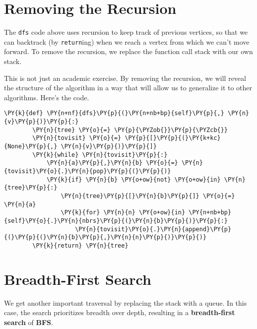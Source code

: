 \section{Removing the Recursion}


The \texttt{dfs} code above uses recursion to keep track of previous vertices, so that we can backtrack (by \texttt{return}ing) when we reach a vertex from which we can't move forward.
To remove the recursion, we replace the function call stack with our own stack.


This is not just an academic exercise.
By removing the recursion, we will reveal the structure of the algorithm in a way that will allow us to generalize it to other algorithms.
Here's the code.

\begin{Verbatim}[commandchars=\\\{\}]
    \PY{k}{def} \PY{n+nf}{dfs}\PY{p}{(}\PY{n+nb+bp}{self}\PY{p}{,} \PY{n}{v}\PY{p}{)}\PY{p}{:}
        \PY{n}{tree} \PY{o}{=} \PY{p}{\PYZob{}}\PY{p}{\PYZcb{}}
        \PY{n}{tovisit} \PY{o}{=} \PY{p}{[}\PY{p}{(}\PY{k+kc}{None}\PY{p}{,} \PY{n}{v}\PY{p}{)}\PY{p}{]}
        \PY{k}{while} \PY{n}{tovisit}\PY{p}{:}
            \PY{n}{a}\PY{p}{,}\PY{n}{b} \PY{o}{=} \PY{n}{tovisit}\PY{o}{.}\PY{n}{pop}\PY{p}{(}\PY{p}{)}
            \PY{k}{if} \PY{n}{b} \PY{o+ow}{not} \PY{o+ow}{in} \PY{n}{tree}\PY{p}{:}
                \PY{n}{tree}\PY{p}{[}\PY{n}{b}\PY{p}{]} \PY{o}{=} \PY{n}{a}
                \PY{k}{for} \PY{n}{n} \PY{o+ow}{in} \PY{n+nb+bp}{self}\PY{o}{.}\PY{n}{nbrs}\PY{p}{(}\PY{n}{b}\PY{p}{)}\PY{p}{:}
                    \PY{n}{tovisit}\PY{o}{.}\PY{n}{append}\PY{p}{(}\PY{p}{(}\PY{n}{b}\PY{p}{,}\PY{n}{n}\PY{p}{)}\PY{p}{)}
        \PY{k}{return} \PY{n}{tree}
\end{Verbatim}


\section{Breadth-First Search}


We get another important traversal by replacing the stack with a queue.
In this case, the search prioritizes breadth over depth, resulting in a \textbf{breadth-first search} of \textbf{BFS}.

